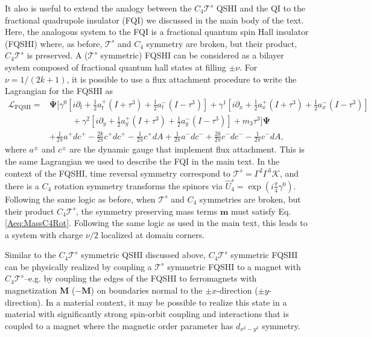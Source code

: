 \documentclass[%
 reprint,
 amsmath,amssymb,
 aps,
]{revtex4-1}
\begin{document}
\begin{appendix}
It also is useful to extend the analogy between the $C_4 \mathcal{T}^{s}$ QSHI and the QI to the fractional quadrupole insulator (FQI) we discussed in the main body of the text. Here, the analogous system to the FQI is a fractional quantum spin Hall insulator (FQSHI)\cite{bernevig2006quantum,levin2009fractional} where, as before, $\mathcal{T}^s$ and $C_4$ symmetry are broken, but their product, $C_4 \mathcal{T}^{s}$ is preserved.  A ($\mathcal{T}^s$ symmetric) FQSHI can be considered as a bilayer system composed of fractional quantum hall states at filling $\pm \nu$. For $\nu = 1/(2k+1)$, it is possible to use a flux attachment procedure to write the Lagrangian for the FQSHI as 
\begin{equation}\begin{split}
\mathcal{L}_{\text{FQSH}} = &\bar{\bm{\Psi}} \Big[\gamma^0 [i\partial_t + \frac{1}{2}a^+_t(I + \tau^3) + \frac{1}{2}a^-_t(I - \tau^3)]  + \gamma^1 [i\partial_x + \frac{1}{2}a^+_x(I + \tau^3) + \frac{1}{2}a^-_x(I - \tau^3)]  \\ &\phantom{==}+ \gamma^2 [i\partial_y + \frac{1}{2}a^+_y(I + \tau^3) + \frac{1}{2}a^-_y(I - \tau^3)] + m_3\tau^3 \Big] \bm{\Psi}\\ & + \frac{1}{2\pi} a^{+}d c^{+} - \frac{2k}{2\pi} c^{+}d c^{+} - \frac{1}{2\pi} c^{+}d A + \frac{1}{2\pi} a^{-}d c^{-} +\frac{2k}{2\pi} c^{-}d c^{-} - \frac{1}{2\pi} c^{-}d A,
\label{Aeq:QSHContinuumFracLag}\end{split}\end{equation}
where $a^\pm$ and $c^\pm$ are the dynamic gauge that implement flux attachment. This is the same Lagrangian we used to describe the FQI in the main text. In the context of the FQSHI, time reversal symmetry correspond to $\mathcal{T}^{s} = \Gamma^2\Gamma^3\mathcal{K}$, and there is a $C_4$ rotation symmetry transforms the spinors via $\hat{U}^s_4 = \exp(i \frac{\pi}{4} \gamma^0)$. Following the same logic as before, when $\mathcal{T}^{s}$ and $C_4$ symmetries are broken, but their product $C_4 \mathcal{T}^{s}$, the symmetry preserving mass terms $\bm{m}$ must satisfy Eq. \ref{Aeq:MassC4Rot}. Following the same logic as used in the main text, this leads to a system with charge $\nu/2$ localized at domain corners. 

Similar to the $C_4\mathcal{T}^s$ symmetric QSHI discussed above, $C_4\mathcal{T}^s$ symmetric FQSHI can be physically realized by coupling a $\mathcal{T}^s$ symmetric FQSHI to a magnet with $C_4\mathcal{T}^s$--e.g. by coupling the edges of the FQSHI to ferromagnets with magnetization $\bm{M}$ ($-\bm{M}$) on boundaries normal to the $\pm x$-direction ($\pm y$-direction). In a material context, it may be possible to realize this state in a material with significantly strong spin-orbit coupling and interactions that is coupled to a magnet where the magnetic order parameter has $d_{x^2-y^2}$ symmetry.


\end{appendix}
\end{document}
